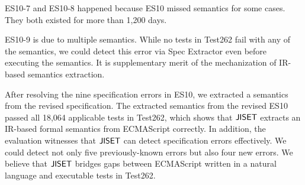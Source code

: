 ES10-7 and ES10-8 happened because ES10 missed semantics for some
cases.  They both existed for more than 1,200 days.

ES10-9 is due to multiple semantics.  While no tests in Test262 fail
with any of the semantics, we could detect this error via {\sf Spec
Extractor} even before executing the semantics. It is supplementary merit of
the mechanization of IR-based semantics extraction.

After resolving the nine specification errors in ES10, we extracted a
semantics from the revised specification.  The extracted semantics
from the revised ES10 passed all 18,064 applicable tests in Test262,
which shows that \( \text{\sf JISET} \) extracts an IR-based formal semantics
from ECMAScript correctly.  In addition, the evaluation witnesses that
\( \text{\sf JISET} \) can detect specification errors effectively.
We could detect not only five previously-known errors
but also four new errors.  We believe that \( \text{\sf JISET} \) bridges gaps
between ECMAScript written in a natural language and executable tests
in Test262.

